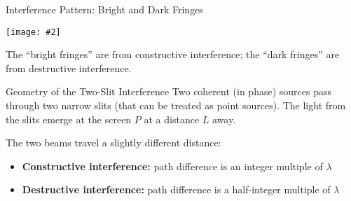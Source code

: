 \documentclass[12pt,compress,aspectratio=169]{beamer}
\newcommand{\pic}[2]{\texttt{[image: \#2]}}
\begin{document}
\begin{frame}{Interference Pattern: Bright and Dark Fringes}
  \begin{center}
    \pic{.4}{graphics/fringes1}
  \end{center}
  The ``bright fringes'' are from constructive interference; the ``dark
  fringes'' are from destructive interference.
\end{frame}



\begin{frame}{Geometry of the Two-Slit Interference}
  Two coherent (in phase) sources pass through two narrow slits (that can be
  treated as point sources). The light from the slits emerge at the screen $P$
  at a distance $L$ away.
  \begin{center}
  \end{center}
  \vspace{-.1in}The two beams travel a slightly different distance:
  \begin{itemize}
  \item\textbf{Constructive interference:} path difference is an integer
    multiple  of $\lambda$
  \item\textbf{Destructive interference:} path difference is a half-integer
    multiple  of $\lambda$
  \end{itemize}
\end{frame}
\end{document}
